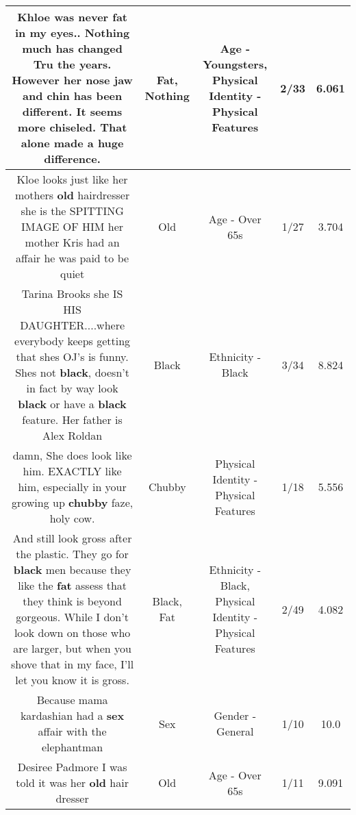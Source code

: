 \documentclass[11pt]{article}
\newlength\mylength
\begin{document}
\begin{center}
\begin{longtable}{|C{.65\mylength}|C{.30\mylength}|C{.12\mylength}|C{.12\mylength}|C{.12\mylength}|}
  \small Khloe was never \textbf{fat} in my eyes.. \textbf{Nothing} much has changed Tru the years. However her nose jaw and chin has been different. It seems more chiseled. That alone made a huge difference.\normalsize   & Fat, Nothing & Age - Youngsters, Physical Identity - Physical Features & 2/33 & 6.061 \\  \hline
  \small Kloe looks just like her mothers \textbf{old} hairdresser she is the SPITTING IMAGE OF HIM her mother Kris had an affair he was paid to be quiet\normalsize   & Old & Age - Over 65s & 1/27 & 3.704 \\  \hline
  \small Tarina Brooks she IS HIS DAUGHTER....where everybody keeps getting that shes OJ's is funny. Shes not \textbf{black}, doesn't in fact by way look \textbf{black} or have a \textbf{black} feature. Her father is Alex Roldan\normalsize   & Black & Ethnicity - Black & 3/34 & 8.824 \\  \hline
  \small damn, She does look like him. EXACTLY like him, especially in your growing up \textbf{chubby} faze, holy cow.\normalsize   & Chubby & Physical Identity - Physical Features & 1/18 & 5.556 \\  \hline
  \small And still look gross after the plastic. They go for \textbf{black} men because they like the \textbf{fat} assess that they think is beyond gorgeous. While I don't look down on those who are larger, but when you shove that in my face, I'll  let you know it is gross.\normalsize   & Black, Fat & Ethnicity - Black, Physical Identity - Physical Features & 2/49 & 4.082 \\  \hline
  \small Because mama kardashian had a \textbf{sex} affair with the elephantman\normalsize   & Sex & Gender - General & 1/10 & 10.0 \\  \hline
  \small Desiree Padmore I was told it was her \textbf{old} hair dresser\normalsize   & Old & Age - Over 65s & 1/11 & 9.091 \\  \hline

\end{longtable}
\end{center}
\end{document}
